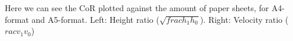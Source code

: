 \documentclass[preview]{standalone}
\begin{document}
\begin{center}
Here we can see the CoR plotted against the amount of paper sheets, for A4-format and A5-format. Left: Height ratio ($\sqrt{frac{h_1}{h_0}}$). Right: Velocity ratio ($rac{v_1}{v_0}$)
\end{center}
\end{document}
